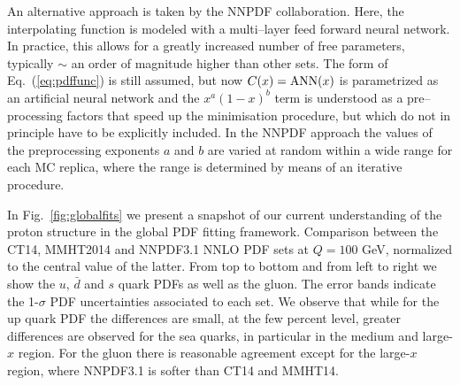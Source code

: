 An alternative approach is taken by the NNPDF collaboration. Here, the interpolating function is modeled with a multi--layer feed forward neural network. In practice, this allows for a greatly increased number of free parameters, typically $\sim$ an order of magnitude higher than other sets.
%
The form of Eq.~(\ref{eq:pdffunc}) is still assumed, but
now $C(x)={\rm ANN}(x)$ is parametrized as an artificial
neural network and the $x^a(1-x)^b$ term is understood
as a pre--processing factors that speed up the minimisation procedure, but which do not in principle have to be explicitly included.
%
In the NNPDF approach the values of the preprocessing exponents
$a$ and $b$ are varied at random within a wide range for each MC
replica, where the range is determined by means of an iterative
procedure.

In Fig.~\ref{fig:globalfits}
we present a snapshot of our current understanding
of the proton structure in the global PDF fitting framework.
%
Comparison between the CT14, MMHT2014
  and NNPDF3.1 NNLO PDF sets at $Q=100$ GeV, normalized
  to the central value of the latter.
  From top to bottom and from left to right we show the
  $u$, $\bar{d}$ and $s$ quark PDFs as well as the gluon.
  The error bands indicate the 1-$\sigma$ PDF uncertainties
  associated to each set.
  We observe that while for the up quark PDF the differences
  are small, at the few percent level, greater differences
  are observed for the sea quarks, in particular
  in the medium and large-$x$ region.
  For the gluon there is reasonable agreement except
  for the large-$x$ region, where NNPDF3.1 is softer than
  CT14 and MMHT14.

